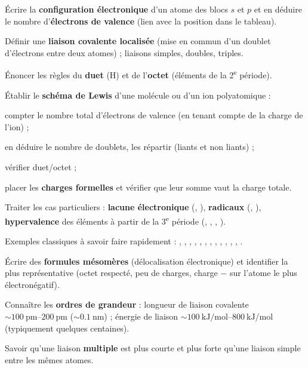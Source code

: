\documentclass[11pt,a4paper]{article}
\begin{document}
\begin{savoir}
  \item Écrire la \textbf{configuration électronique} d'un atome des blocs $s$ et $p$ et en
        déduire le nombre d'\textbf{électrons de valence} (lien avec la position dans le tableau).
  \item Définir une \textbf{liaison covalente localisée} (mise en commun d'un doublet
        d'électrons entre deux atomes) ; liaisons simples, doubles, triples.
  \item Énoncer les règles du \textbf{duet} (H) et de l'\textbf{octet} (éléments de la 2\textsuperscript{e} période).
  \item Établir le \textbf{schéma de Lewis} d'une molécule ou d'un ion polyatomique :
    \begin{savoir}
      \item compter le nombre total d'électrons de valence (en tenant compte de la charge de l'ion) ;
      \item en déduire le nombre de doublets, les répartir (liants et non liants) ;
      \item vérifier duet/octet ;
      \item placer les \textbf{charges formelles} et vérifier que leur somme vaut la charge totale.
    \end{savoir}
  \item Traiter les cas particuliers : \textbf{lacune électronique} (, ),
        \textbf{radicaux} (, ), \textbf{hypervalence} des éléments à partir de la
        3\textsuperscript{e} période (, , , ).
  \item Exemples classiques à savoir faire rapidement : , , , ,
        , , , , , , ,
        , .
  \item Écrire des \textbf{formules mésomères} (délocalisation électronique) et identifier la plus
        représentative (octet respecté, peu de charges, charge $-$ sur l'atome le plus électronégatif).
  \item Connaître les \textbf{ordres de grandeur} :
        longueur de liaison covalente $\sim \SIrange{100}{200}{\pico\metre}$ ($\sim\SI{0.1}{\nano\metre}$) ;
        énergie de liaison $\sim \SIrange{100}{800}{\kilo\joule\per\mol}$ (typiquement quelques centaines).
  \item Savoir qu'une liaison \textbf{multiple} est plus courte et plus forte qu'une liaison simple
        entre les mêmes atomes.
\end{savoir}
\end{document}
